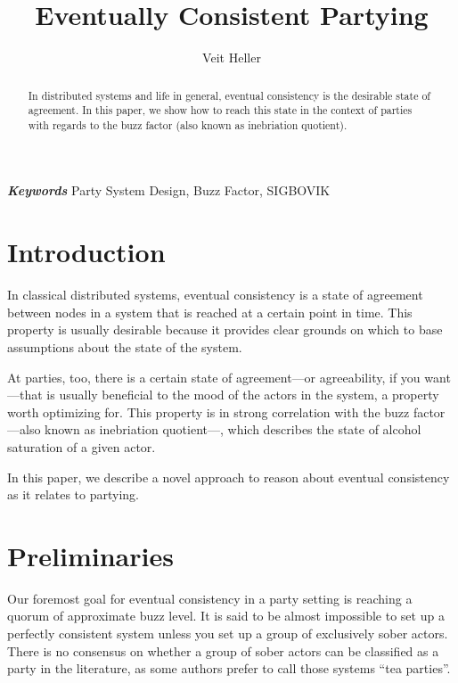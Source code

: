 \documentclass[twocolumn]{article}
\providecommand{\keywords}[1]{\noindent \textbf{\textit{Keywords}} #1}
\begin{document}
\title{Eventually Consistent Partying}
\author{Veit Heller}

\maketitle

\begin{abstract}
In distributed systems and life in general, eventual consistency is the
desirable state of agreement. In this paper, we show how to reach this state in
the context of parties with regards to the buzz factor (also known as
inebriation quotient).
\end{abstract}

\bigskip

\keywords{Party System Design, Buzz Factor, SIGBOVIK}

\section{Introduction}

In classical distributed systems, eventual consistency is a state of agreement
between nodes in a system that is reached at a certain point in time. This
property is usually desirable because it provides clear grounds on which to
base assumptions about the state of the system.

At parties, too, there is a certain state of agreement—or agreeability, if you
want—that is usually beneficial to the mood of the actors in the system, a
property worth optimizing for. This property is in strong correlation with the
buzz factor—also known as inebriation quotient—, which describes the state of
alcohol saturation of a given actor.

In this paper, we describe a novel approach to reason about eventual
consistency as it relates to partying.

\section{Preliminaries}

Our foremost goal for eventual consistency in a party setting is reaching a
quorum of approximate buzz level. It is said to be almost impossible to set up
a perfectly consistent system unless you set up a group of exclusively sober
actors. There is no consensus on whether a group of sober actors can be
classified as a party in the literature, as some authors prefer to call those
systems “tea parties”.
\end{document}
